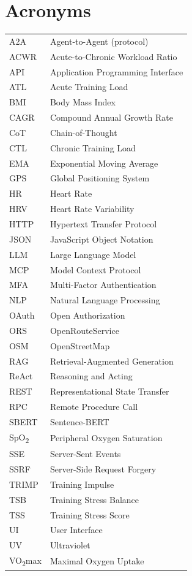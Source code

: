 \section*{Acronyms}
\begin{table}[hb]
    \begin{tabularx}{\textwidth}{p{3cm} X}
     A2A & Agent-to-Agent (protocol) \\
     ACWR & Acute-to-Chronic Workload Ratio \\
     API & Application Programming Interface \\
     ATL & Acute Training Load \\
     BMI & Body Mass Index \\
     CAGR & Compound Annual Growth Rate \\
     CoT & Chain-of-Thought \\
     CTL & Chronic Training Load \\
     EMA & Exponential Moving Average \\
     GPS & Global Positioning System \\
     HR & Heart Rate \\
     HRV & Heart Rate Variability \\
     HTTP & Hypertext Transfer Protocol \\
     JSON & JavaScript Object Notation \\
     LLM & Large Language Model \\
     MCP & Model Context Protocol \\
     MFA & Multi-Factor Authentication \\
     NLP & Natural Language Processing \\
     OAuth & Open Authorization \\
     ORS & OpenRouteService \\
     OSM & OpenStreetMap \\
     RAG & Retrieval-Augmented Generation \\
     ReAct & Reasoning and Acting \\
     REST & Representational State Transfer \\
     RPC & Remote Procedure Call \\
     SBERT & Sentence-BERT \\
     SpO\textsubscript{2} & Peripheral Oxygen Saturation \\
     SSE & Server-Sent Events \\
     SSRF & Server-Side Request Forgery \\
     TRIMP & Training Impulse \\
     TSB & Training Stress Balance \\
     TSS & Training Stress Score \\
     UI & User Interface \\
     UV & Ultraviolet \\
     VO\textsubscript{2}max & Maximal Oxygen Uptake \\
    \end{tabularx}%
\end{table}%
